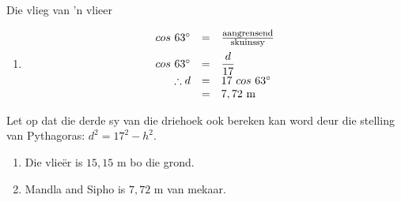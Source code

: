 \begin{wex}{Die vlieg van 'n vlieer}
{\begin{minipage}{\textwidth}
\begin{enumerate}[noitemsep, label=\textbf{\arabic*}. ]
\item
\begin{equation*}
 \begin{array}{ccl}
\hfill cos~63^{\circ} &= & \frac{\mbox{\footnotesize aangrensend}}{\mbox{\footnotesize skuinssy}} \hfill \vspace{5pt}\\
\hfill cos~63^{\circ} &=& \dfrac{d}{17} \hfill \\
\hfill \therefore d &= & 17~cos ~63^{\circ} \hfill \\
\hfill  &=& 7,72~\mbox{m} \hfill \\
\end{array}
\end{equation*}
\end{enumerate}
Let op dat die derde sy van die driehoek ook bereken kan word deur die stelling van Pythagoras: $d^{2} = 17^{2} - h^{2}$.

\begin{enumerate}[noitemsep, label=\textbf{\arabic*}. ] 
\item Die vlie\"er is $15,15$ m bo die grond.
\item Mandla and Sipho is $7,72$ m van mekaar.
\end{enumerate}
\end{minipage}
}
 
\end{wex}

